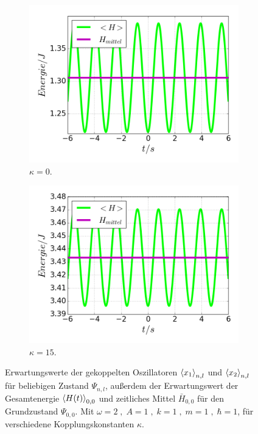 \begin{figure}
      \begin{subfigure}[t]{0.5\textwidth}
        \centering
        \includegraphics[width=\textwidth]{plots/<H>00_kappa0.png}
        \caption{$\kappa=0$.}
        \label{fig:H_kappa0}
      \end{subfigure}
      \begin{subfigure}[t]{0.5\textwidth}
          \centering
          \includegraphics[width=\textwidth]{plots/<H>00_kappa15.png}
          \caption{$\kappa=15$.}
          \label{fig:H_kappa15}
      \end{subfigure}
      \caption{Erwartungswerte der gekoppelten Oszillatoren $\braket{x_1}_{n,l}$ und $\braket{x_2}_{n,l}$ für beliebigen Zustand $\Psi_{n,l}$, außerdem der Erwartungswert der Gesamtenergie $\braket{H(t)}_{0,0}$ und zeitliches Mittel $\bar H_{0,0}$ für den Grundzustand $\Psi_{0,0}$. Mit $\omega=2 \;,\; A=1 \;,\; k=1 \;,\; m=1 \;,\; \hbar=1$, für verschiedene Kopplungskonstanten $\kappa$.}
    \end{figure}
